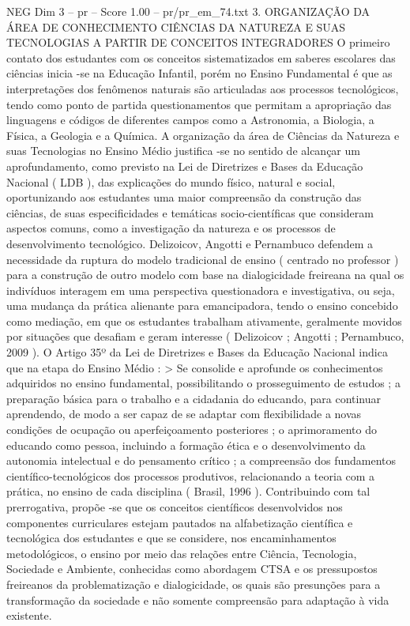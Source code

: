 \begin{textsample}{NEG Dim 3 – pr – Score 1.00 – pr/pr\_em\_74.txt}  \label{ex:f3_neg_139}
3.
ORGANIZAÇÃO DA ÁREA DE CONHECIMENTO CIÊNCIAS DA NATUREZA E SUAS TECNOLOGIAS A PARTIR DE CONCEITOS INTEGRADORES O primeiro contato dos estudantes com os conceitos sistematizados em saberes escolares das ciências inicia -se na Educação Infantil, porém no Ensino Fundamental é que as interpretações dos fenômenos naturais são articuladas aos processos tecnológicos, tendo como ponto de partida questionamentos que permitam a apropriação das linguagens e códigos de diferentes campos como a Astronomia, a Biologia, a Física, a Geologia e a Química.
A organização da área de Ciências da Natureza e suas Tecnologias no Ensino Médio justifica -se no sentido de alcançar um aprofundamento, como previsto na Lei de Diretrizes e Bases da Educação Nacional ( LDB ), das explicações do mundo físico, natural e social, oportunizando aos estudantes uma maior compreensão da construção das ciências, de suas especificidades e temáticas socio-científicas que consideram aspectos comuns, como a investigação da natureza e os processos de desenvolvimento tecnológico.
Delizoicov, Angotti e Pernambuco defendem a necessidade da ruptura do modelo tradicional de ensino ( centrado no professor ) para a construção de outro modelo com base na dialogicidade freireana na qual os indivíduos interagem em uma perspectiva questionadora e investigativa, ou seja, uma mudança da prática alienante para emancipadora, tendo o ensino concebido como mediação, em que os estudantes trabalham ativamente, geralmente movidos por situações que desafiam e geram interesse ( Delizoicov ; Angotti ; Pernambuco, 2009 ).
O Artigo 35º da Lei de Diretrizes e Bases da Educação Nacional indica que na etapa do Ensino Médio : > Se consolide e aprofunde os conhecimentos adquiridos no ensino fundamental, possibilitando o prosseguimento de estudos ; a preparação básica para o trabalho e a cidadania do educando, para continuar aprendendo, de modo a ser capaz de se adaptar com flexibilidade a novas condições de ocupação ou aperfeiçoamento posteriores ; o aprimoramento do educando como pessoa, incluindo a formação ética e o desenvolvimento da autonomia intelectual e do pensamento crítico ; a compreensão dos fundamentos científico-tecnológicos dos processos produtivos, relacionando a teoria com a prática, no ensino de cada disciplina ( Brasil, 1996 ).
Contribuindo com tal prerrogativa, propõe -se que os conceitos científicos desenvolvidos nos componentes curriculares estejam pautados na alfabetização científica e tecnológica dos estudantes e que se considere, nos encaminhamentos metodológicos, o ensino por meio das relações entre Ciência, Tecnologia, Sociedade e Ambiente, conhecidas como abordagem CTSA e os pressupostos freireanos da problematização e dialogicidade, os quais são presunções para a transformação da sociedade e não somente compreensão para adaptação à vida existente.

\end{textsample}
